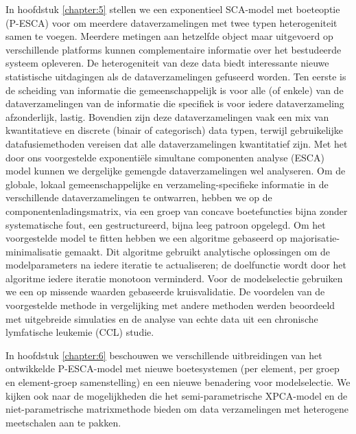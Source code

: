 In hoofdstuk \ref{chapter:5} stellen we een exponentieel SCA-model met boeteoptie (P-ESCA) voor om meerdere dataverzamelingen met twee typen heterogeniteit samen te voegen. Meerdere metingen aan hetzelfde object maar uitgevoerd op verschillende platforms kunnen complementaire informatie over het bestudeerde systeem opleveren. De heterogeniteit van deze data biedt interessante nieuwe statistische uitdagingen als de dataverzamelingen gefuseerd worden. Ten eerste is de scheiding van informatie die gemeenschappelijk is voor alle (of enkele) van de dataverzamelingen van de informatie die specifiek is voor iedere dataverzameling afzonderlijk, lastig. Bovendien zijn deze dataverzamelingen vaak een mix van kwantitatieve en discrete (binair of categorisch) data typen, terwijl gebruikelijke datafusiemethoden vereisen dat alle dataverzamelingen kwantitatief zijn. Met het door ons voorgestelde exponenti\"ele simultane componenten analyse (ESCA) model kunnen we dergelijke gemengde dataverzamelingen wel analyseren. Om de globale, lokaal gemeenschappelijke en verzameling-specifieke informatie in de verschillende dataverzamelingen te ontwarren, hebben we op de componentenladingsmatrix, via een groep van concave boetefuncties bijna zonder systematische fout, een gestructureerd, bijna leeg patroon opgelegd. Om het voorgestelde model te fitten hebben we een algoritme gebaseerd op majorisatie-minimalisatie gemaakt. Dit algoritme gebruikt analytische oplossingen om de modelparameters na iedere iteratie te actualiseren; de doelfunctie wordt door het algoritme iedere iteratie monotoon verminderd. Voor de modelselectie gebruiken we een op missende waarden gebaseerde kruisvalidatie. De voordelen van de voorgestelde methode in vergelijking met andere methoden werden beoordeeld met uitgebreide simulaties en de analyse van echte data uit een chronische lymfatische leukemie (CCL) studie.

In hoofdstuk \ref{chapter:6} beschouwen we verschillende uitbreidingen van het ontwikkelde P-ESCA-model met nieuwe boetesystemen (per element, per groep en element-groep samenstelling) en een nieuwe benadering voor modelselectie. We kijken ook naar de mogelijkheden die het semi-parametrische XPCA-model en de niet-parametrische matrixmethode bieden om data verzamelingen met heterogene meetschalen aan te pakken.
